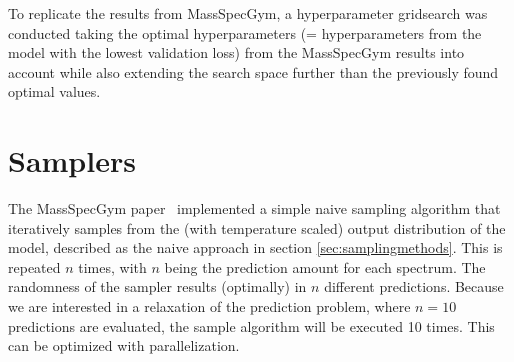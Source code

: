 To replicate the results from MassSpecGym, a hyperparameter gridsearch was conducted taking the optimal hyperparameters (= hyperparameters from the model with the lowest validation loss) from the MassSpecGym results into account
while also extending the search space further than the previously found optimal values.

\begin{table}[h]
	\caption{
		Gridsearch MassSpecGym vs Gridsearch from this Thesis (lowest validation loss models in bold)
	}
	\label{tab:gridsearch}
\end{table}


\section{Samplers}
\label{sec:samplers}

The MassSpecGym paper~\cite{bushuiev2024massspecgym} implemented a simple naive sampling algorithm that iteratively samples from the (with temperature scaled) output distribution of the model, described as the naive approach in section \ref{sec:samplingmethods}.
This is repeated $n$ times, with $n$ being the prediction amount for each spectrum. The randomness of the sampler results (optimally) in $n$ different predictions.
Because we are interested in a relaxation of the prediction problem, where $n=10$ predictions are evaluated, the sample algorithm will be executed 10 times. This can be optimized with parallelization.


